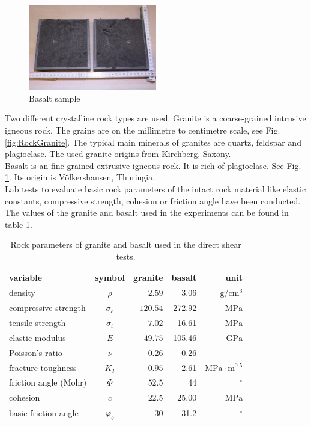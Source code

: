 \begin{figure}[!ht]
\begin{center}
\includegraphics[width=0.5\textwidth]{./figures/ExpRockBasalt.jpg}
\end{center}
\caption{Basalt sample}
\label{fig:RockBasalt}
\end{figure}

Two different crystalline rock types are used. Granite is a coarse-grained intrusive igneous rock. The grains are on the millimetre to centimetre scale, see Fig. \ref{fig:RockGranite}. The typical main minerals of granites are quartz, feldspar and plagioclase. The used granite origins from Kirchberg, Saxony.\\
Basalt is an fine-grained extrusive igneous rock. It is rich of plagioclase. See Fig. \ref{fig:RockBasalt}. Its origin is V\"olkershausen, Thuringia.\\
Lab tests to evaluate basic rock parameters of the intact rock material like elastic constants, compressive strength, cohesion or friction angle have been conducted. The values of the granite and basalt used in the experiments can be found in table \ref{table:MEX7_rockParam}.\\
\begin{table}[!ht]
\begin{center}
\begin{tabular}{l c r r r}
variable & symbol & granite & basalt & unit\\
\hline
density & $\rho$ & $2.59$ &3.06 &$\text{g}/\text{cm}^3$\\
compressive strength & $\sigma_c$ & $120.54$&272.92 &$\text{MPa}   $\\
tensile strength & $\sigma_t$ & $7.02$&16.61 &$ \text{MPa}   $\\
elastic modulus & $E$ & $49.75$&105.46 &$ \text{GPa}   $\\
Poisson's ratio & $\nu$ & 0.26 & 0.26  & -\\
fracture toughness & $K_I$ & $0.95$& 2.61 &$\text{MPa}\cdot\text{m}^{0.5}$\\
friction angle (Mohr) & $\Phi$ &  $52.5$& 44 &$^\circ$\\
cohesion & $c$ &  $22.5$& 25.00  &$ \text{MPa}   $\\
basic friction angle &$\varphi_b$ &30 & 31.2 & $^\circ$\\
\end{tabular}
\caption{Rock parameters of granite and basalt used in the direct shear tests.}
\label{table:MEX7_rockParam}
\end{center}
\end{table}